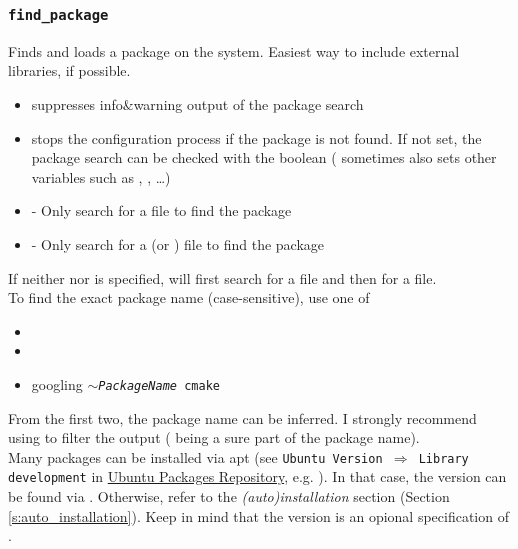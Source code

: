 \subsubsection{\texttt{find\_package}}
\begin{center}  \end{center}
Finds and loads a package on the system. Easiest way to include external libraries, if possible.
\begin{itemize}
    \item {} suppresses info\&warning output of the package search
    \item {} stops the configuration process if the package is not found. If not set, the package search can be checked with the boolean  ( sometimes also sets other variables such as , , \ldots)
    \item {} - Only search for a  file to find the package
    \item {} - Only search for a  (or ) file to find the package
\end{itemize}

If neither  nor  is specified,  will first search for a  file and then for a  file. \\

To find the exact package name (case-sensitive), use one of
\begin{itemize}
    \item {}
    \item {}
    \item googling \texttt{$\sim$\textit{PackageName} cmake}
\end{itemize}
From the first two, the package name can be inferred. I strongly recommend using  to filter the output ( being a sure part of the package name). \\

Many packages can be installed via apt (see \texttt{Ubuntu Version $\Rightarrow$ Library development} in \href{https://packages.ubuntu.com/}{Ubuntu Packages Repository}, e.g. ). In that case, the version can be found via .
Otherwise, refer to the \textit{(auto)installation} section (Section \ref{s:auto_installation}). Keep in mind that the version is an opional specification of .

